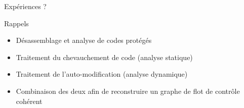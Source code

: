 \documentclass{beamer}
\begin{document}
\begin{frame}{Expériences ?}

\end{frame}

\begin{frame}{Rappels}
\begin{itemize}
 \item Désassemblage et analyse de codes protégés
 \item Traitement du chevauchement de code (analyse statique)
 \item Traitement de l'auto-modification (analyse dynamique)
 \item Combinaison des deux afin de reconstruire un graphe de flot de contrôle cohérent
\end{itemize}
\end{frame}
\end{document}
